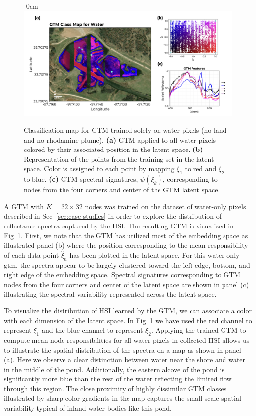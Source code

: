 \documentclass[remotesensing,article,submit,pdftex,moreauthors]{Definitions/mdpi}
\begin{document}
\begin{figure}[t]
\begin{adjustwidth}{-\extralength}{0cm}
\centering
\includegraphics[width=18.0cm]{paper/figures/results/gtm-water.png}
\end{adjustwidth}
\caption{Classification map for GTM trained solely on water pixels (no land and no rhodamine plume). \textbf{(a)} GTM applied to all water pixels colored by their associated position in the latent space. \textbf{(b)} Representation of the points from the training set in the latent space. Color is assigned to each point by mapping $\xi_1$ to red and $\xi_2$ to blue. \textbf{(c)} GTM spectral signatures, $\psi(\xi_k)$, corresponding to nodes from the four corners and center of the GTM latent space. \label{fig:gtm-water}}
\end{figure}  

A GTM with $K=32\times 32$ nodes was trained on the dataset of water-only pixels described in Sec~\ref{sec:case-studies} in order to explore the distribution of reflectance spectra captured by the HSI. The resulting GTM is visualized in Fig~\ref{fig:gtm-water}. First, we note that the GTM has utilized most of the embedding space as illustrated panel (b) where the position corresponding to the mean responsibility of each data point $\hat{\xi}_n$ has been plotted in the latent space. For this water-only gtm, the spectra appear to be largely clustered toward the left edge, bottom, and right edge of the embedding space. Spectral signatures corresponding to GTM nodes from the four corners and center of the latent space are shown in panel (c) illustrating the spectral variability represented across the latent space. 

To visualize the distribution of HSI learned by the GTM, we can associate a color with each dimension of the latent space. In Fig~\ref{fig:gtm-water} we have used the red channel to represent $\xi_1$ and the blue channel to represent $\xi_2$. Applying the trained GTM to compute mean node responsibilities for all water-pixels in collected HSI allows us to illustrate the spatial distribution of the spectra on a map as shown in panel (a). Here we observe a clear distinction between water near the shore and water in the middle of the pond. Additionally, the eastern alcove of the pond is significantly more blue than the rest of the water reflecting the limited flow through this region. The close proximity of highly dissimilar GTM classes illustrated by sharp color gradients in the map captures the small-scale spatial variability typical of inland water bodies like this pond.
\end{document}
